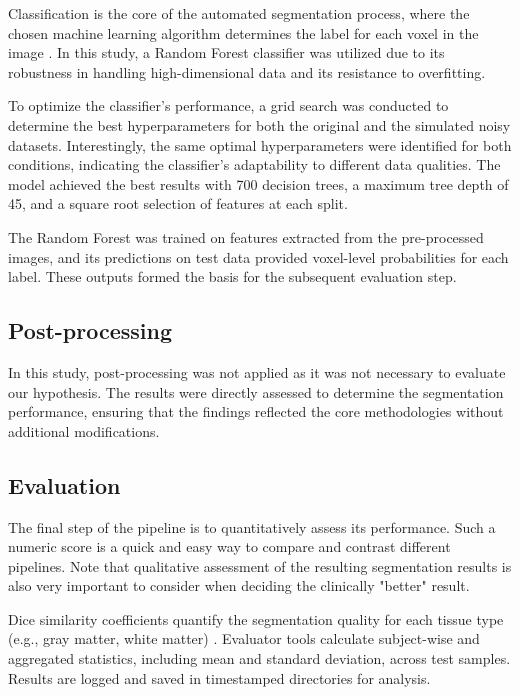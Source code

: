 Classification is the core of the automated segmentation process, where the chosen machine learning algorithm determines the label for each voxel in the image \cite{b8}. In this study, a Random Forest classifier was utilized due to its robustness in handling high-dimensional data and its resistance to overfitting.

To optimize the classifier’s performance, a grid search was conducted to determine the best hyperparameters for both the original and the simulated noisy datasets. Interestingly, the same optimal hyperparameters were identified for both conditions, indicating the classifier’s adaptability to different data qualities. The model achieved the best results with 700 decision trees, a maximum tree depth of 45, and a square root selection of features at each split.

The Random Forest was trained on features extracted from the pre-processed images, and its predictions on test data provided voxel-level probabilities for each label. These outputs formed the basis for the subsequent evaluation step.


\subsection{Post-processing}

In this study, post-processing was not applied as it was not necessary to evaluate our hypothesis. The results were directly assessed to determine the segmentation performance, ensuring that the findings reflected the core methodologies without additional modifications.


\subsection{Evaluation}

The final step of the pipeline is to quantitatively assess its performance. Such a numeric score is a quick and easy way to compare and contrast different pipelines. Note that qualitative assessment of the resulting segmentation results is also very important to consider when deciding the clinically "better" result.

Dice similarity coefficients quantify the segmentation quality for each tissue type (e.g., gray matter, white matter) \cite{b12}. Evaluator tools calculate subject-wise and aggregated statistics, including mean and standard deviation, across test samples. Results are logged and saved in timestamped directories for analysis.

